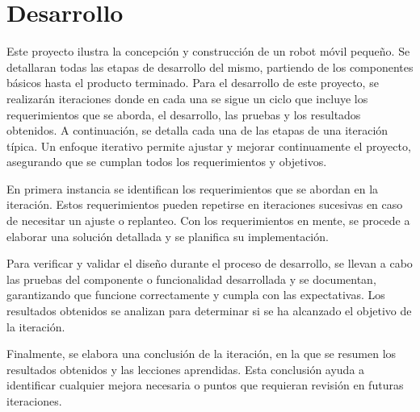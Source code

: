 \newpage
\chapter{Desarrollo}

Este proyecto ilustra la concepción y construcción de un robot móvil pequeño. Se detallaran todas las etapas de desarrollo del mismo, partiendo de los componentes básicos hasta el producto terminado. Para el desarrollo de este proyecto, se realizarán iteraciones donde en cada una se sigue un ciclo que incluye los requerimientos que se aborda, el desarrollo, las pruebas y los resultados obtenidos. A continuación, se detalla cada una de las etapas de una iteración típica. Un enfoque iterativo permite ajustar y mejorar continuamente el proyecto, asegurando que se cumplan todos los requerimientos y objetivos.

En primera instancia se identifican los requerimientos que se abordan en la iteración. Estos requerimientos pueden repetirse en iteraciones sucesivas en caso de necesitar un ajuste o replanteo. Con los requerimientos en mente, se procede a elaborar una solución detallada y se planifica su implementación.

Para verificar y validar el diseño durante el proceso de desarrollo, se llevan a cabo las pruebas del componente o funcionalidad desarrollada y se documentan, garantizando que funcione correctamente y cumpla con las expectativas. Los resultados obtenidos se analizan para determinar si se ha alcanzado el objetivo de la iteración.

Finalmente, se elabora una conclusión de la iteración, en la que se resumen los resultados obtenidos y las lecciones aprendidas. Esta conclusión ayuda a identificar cualquier mejora necesaria o puntos que requieran revisión en futuras iteraciones.














